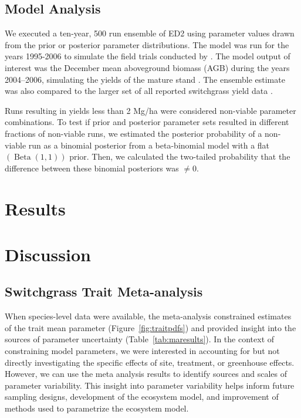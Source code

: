 \documentclass[12pt]{article}
\begin{document}
\begin{flushleft}
\begin{spacing}{1.9}
\subsection*{Model Analysis}
 We executed a ten-year, 500 run ensemble of ED2 using parameter values drawn from the prior or posterior parameter distributions.
 The model was run for the years 1995-2006 to simulate the field trials conducted by \cite{heaton2008mub}.  
 The model output of interest was the December mean aboveground biomass (AGB) during the years 2004--2006, simulating the yields of the mature stand \citep{heaton2008mub}.
 The ensemble estimate was also compared to the larger set of all reported switchgrass yield data \citep{wang2010qrc}.  

  Runs resulting in yields less than 2 Mg/ha were considered non-viable parameter combinations. 
  To test if prior and posterior parameter sets resulted in different fractions of non-viable runs, we estimated the posterior probability of a non-viable run as a binomial posterior from a beta-binomial model with a flat $\left(\operatorname{Beta}(1,1)\right)$ prior.
 Then, we calculated the two-tailed probability that the difference between these binomial posteriors was $\neq 0$.

\section*{Results}
\label{sec:results}


\section*{Discussion}
\label{sec:discussion}
   
\subsection*{Switchgrass Trait Meta-analysis}
 When species-level data were available, the meta-analysis constrained estimates of the trait mean parameter (Figure~\ref{fig:traitpdfs}) and provided insight into the sources of parameter uncertainty (Table~\ref{tab:maresults}).
 In the context of constraining model parameters, we were interested in accounting for but not directly investigating the specific effects of site, treatment, or greenhouse effects.
 However, we can use the meta analysis results to identify sources and scales of parameter variability.
 This insight into parameter variability helps inform future sampling designs, development of the ecosystem model, and improvement of methods used to parametrize the ecosystem model.


\end{spacing}
\end{flushleft}
\end{document}
